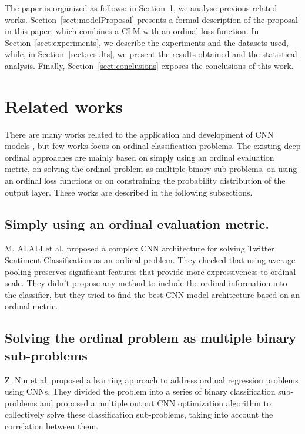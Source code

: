 \documentclass[journal]{IEEEtran}
\begin{document}
	The paper is organized as follows: in Section~\ref{sect:relatedwork}, we analyse previous related works. Section~\ref{sect:modelProposal} presents a formal description of the proposal in this paper, which combines a CLM with an ordinal loss function. In Section~\ref{sect:experiments}, we describe the experiments and the datasets used, while, in Section~\ref{sect:results}, we present the results obtained and the statistical analysis. Finally, Section~\ref{sect:conclusions} exposes the conclusions of this work.
	
	\section{Related works}
	\label{sect:relatedwork}
	There are many works related to the application and development of CNN models \cite{liu2017deep}, but few works focus on ordinal classification problems. The existing deep ordinal approaches are mainly based on simply using an ordinal evaluation metric, on solving the ordinal problem as multiple binary sub-problems, on using an ordinal loss functions or on constraining the probability distribution of the output layer. These works are described in the following subsections.
	
	
	\subsection{Simply using an ordinal evaluation metric.}
		
	M. ALALI et al. \cite{alali2018multi} proposed a complex CNN architecture for solving Twitter Sentiment Classification as an ordinal problem. They checked that using average pooling preserves significant features that provide more expressiveness to ordinal scale. They didn't propose any method to include the ordinal information into the classifier, but they tried to find the best CNN model architecture based on an ordinal metric.

	\subsection{Solving the ordinal problem as multiple binary sub-problems}
	
	Z. Niu et al. \cite{niu2016ordinal} proposed a learning approach to address ordinal regression problems using CNNs. They divided the problem into a series of binary classification sub-problems and proposed a multiple output CNN optimization algorithm to collectively solve these classification sub-problems, taking into account the correlation between them.
	
\end{document}
